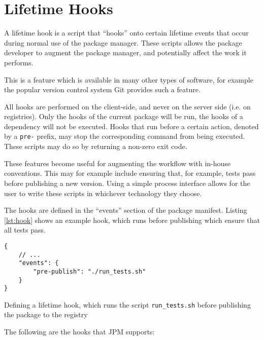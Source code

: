 \section{Lifetime Hooks}
\label{sec:lifetime_hooks}

A lifetime hook is a script that ``hooks'' onto certain lifetime events that
occur during normal use of the package manager. These scripts allows the
package developer to augment the package manager, and potentially affect the
work it performs.

This is a feature which is available in many other types of software, for
example the popular version control system Git provides such a
feature\autocite{chacon2009pro}.

All hooks are performed on the client-side, and never on the server side (i.e.
on registries). Only the hooks of the current package will be run, the
hooks of a dependency will not be executed. Hooks that run before a certain
action, denoted by a \verb!pre-! prefix, may stop the corresponding command
from being executed.  These scripts may do so by returning a non-zero exit
code.

These features become useful for augmenting the workflow with in-house
conventions. This may for example include ensuring that, for example, tests
pass before publishing a new version. Using a simple process interface allows
for the user to write these scripts in whichever technology they choose.

The hooks are defined in the ``events'' section of the package manifest.
Listing \ref{lst:hook} shows an example hook, which runs before publishing
which ensure that all tests pass.

\begin{listing}[H]
\begin{verbatim}
{
    // ...
    "events": {
        "pre-publish": "./run_tests.sh"
    }
}
\end{verbatim}

\caption{Defining a lifetime hook, which runs the script
    \texttt{run_tests.sh} before publishing the package to the
        registry}

\label{lst:hook}

\end{listing}

The following are the hooks that JPM supports:


